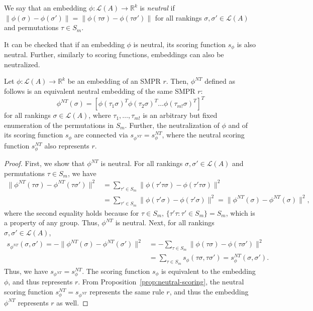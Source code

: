 \documentclass[prodmode]{acmsmall-ec14}
\newcommand{\calL}{{\mathcal{L}}}
\newcommand{\rank}{{\calL(A)}}
\newcommand{\nt}{NT}
\begin{document}
\begin{definition}
We say that an embedding $\phi:\rank \rightarrow \mathbb{R}^k$ is \emph{neutral} if $\|\phi(\sigma)-\phi(\sigma')\| = \|\phi(\tau \sigma)-\phi(\tau\sigma')\|$ for all rankings $\sigma,\sigma' \in \rank$ and permutations $\tau \in S_m$.
\end{definition}
%
It can be checked that if an embedding $\phi$ is neutral, its scoring function $s_{\phi}$ is also neutral. Further, similarly to scoring functions, embeddings can also be neutralized. 

\begin{lemma}
Let $\phi: \rank \to \mathbb{R}^k$ be an embedding of an SMPR $r$. Then, $\phi^{\nt}$ defined as follows is an equivalent neutral embedding of the same SMPR $r$: 
\begin{equation}
\phi^{\nt}(\sigma) = [\phi(\tau_1 \sigma)^T \phi(\tau_2 \sigma)^T \ldots \phi(\tau_{m!} \sigma)^T]^T
\label{eqn:phi-nt}
\end{equation}
for all rankings $\sigma \in \rank$, where $\tau_1,\ldots,\tau_{m!}$ is an arbitrary but fixed enumeration of the permutations in $S_m$. Further, the neutralization of $\phi$ and of its scoring function $s_{\phi}$ are connected via $s_{\phi^{\nt}} = s ^{\nt}_{\phi}$, where the neutral scoring function $s ^{\nt}_{\phi}$ also represents $r$. 
\label{lem:neutral-embedding}
\end{lemma}
\begin{proof}
First, we show that $\phi^{\nt}$ is neutral. For all rankings $\sigma,\sigma' \in \rank$ and permutations $\tau \in S_m$, we have
\begin{align*}
\|\phi^{\nt}(\tau \sigma)-\phi^{\nt}(\tau \sigma')\|^2 &= \sum_{\tau' \in S_m} \|\phi(\tau' \tau \sigma)-\phi(\tau' \tau \sigma)\|^2 \\
&= \sum_{\tau' \in S_m} \|\phi(\tau' \sigma)-\phi(\tau' \sigma)\|^2 = \|\phi^{\nt}(\sigma)-\phi^{\nt}(\sigma)\|^2,
\end{align*}
where the second equality holds because for $\tau \in S_m$, $\{\tau' \tau : \tau' \in S_m\} = S_m$, which is a property of any group. Thus, $\phi^{\nt}$ is neutral. Next, for all rankings $\sigma,\sigma' \in \rank$, 
\begin{align*}
s_{\phi^{\nt}}(\sigma,\sigma') = -\|\phi^{\nt}(\sigma)-\phi^{\nt}(\sigma')\|^2 &= - \sum_{\tau \in S_m} \|\phi(\tau \sigma)-\phi(\tau \sigma')\|^2  \\
&= \sum_{\tau \in S_m} s_{\phi}(\tau \sigma,\tau \sigma') = s_{\phi}^{\nt}(\sigma,\sigma').
\end{align*}
Thus, we have $s_{\phi^{\nt}} = s_{\phi}^{\nt}$. The scoring function $s_{\phi}$ is equivalent to the embedding $\phi$, and thus represents $r$. From Proposition~\ref{prop:neutral-scoring}, the neutral scoring function $s_{\phi}^{\nt} = s_{\phi^{\nt}}$ represents the same rule $r$, and thus the embedding $\phi^{\nt}$ represents $r$ as well. 
\end{proof}
\end{document}
